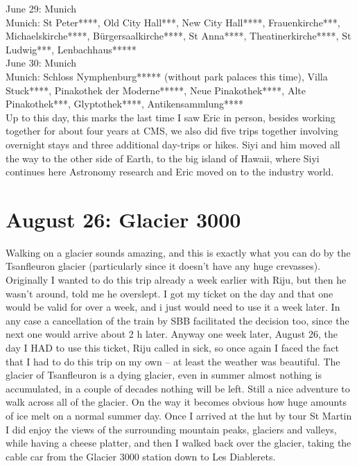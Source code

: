 June 29: Munich\\
Munich: St Peter****, Old City Hall***, New City Hall****, Frauenkirche***, Michaelskirche****, B\"urgersaalkirche****, St Anna****, Theatinerkirche****, St Ludwig***, Lenbachhaus*****\\

June 30: Munich\\
Munich: Schloss Nymphenburg***** (without park palaces this time), Villa Stuck****, Pinakothek der Moderne*****, Neue Pinakothek****, Alte Pinakothek***, Glyptothek****, Antikensammlung****\\

Up to this day, this marks the last time I saw Eric in person, besides working together for about four years at CMS, we also did five trips together involving overnight stays and three additional day-trips or hikes. Siyi and him moved all the way to the other side of Earth, to the big island of Hawaii, where Siyi continues here Astronomy research and Eric moved on to the industry world.\\

\section{August 26: Glacier 3000}
\label{lesdiablerets2017}

Walking on a glacier sounds amazing, and this is exactly what you can do by the Tsanfleuron glacier (particularly since it doesn't have any huge crevasses). Originally I wanted to do this trip already a week earlier with Riju, but then he wasn't around, told me he overslept. I got my ticket on the day and that one would be valid for over a week, and i just would need to use it a week later. In any case a cancellation of the train by SBB facilitated the decision too, since the next one would arrive about 2 h later. Anyway one week later, August 26, the day I HAD to use this ticket, Riju called in sick, so once again I faced the fact that I had to do this trip on my own -- at least the weather was beautiful. The glacier of Tsanfleuron is a dying glacier, even in summer almost nothing is accumulated, in a couple of decades nothing will be left. Still a nice adventure to walk across all of the glacier. On the way it becomes obvious how huge amounts of ice melt on a normal summer day. Once I arrived at the hut by tour St Martin I did enjoy the views of the surrounding mountain peaks, glaciers and valleys, while having a cheese platter, and then I walked back over the glacier, taking the cable car from the Glacier 3000 station down to Les Diablerets.

